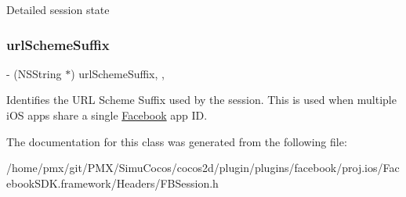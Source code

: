 Detailed session state \mbox{\label{interfaceFBSession_a207345e1a1ca06ee59a56a6b0d78231a}} 
\subsubsection{\texorpdfstring{url\+Scheme\+Suffix}{urlSchemeSuffix}}
{\footnotesize\ttfamily -\/ (N\+S\+String $\ast$) url\+Scheme\+Suffix\hspace{0.3cm}{\ttfamily [read]}, {\ttfamily [atomic]}, {\ttfamily [copy]}}

Identifies the U\+RL Scheme Suffix used by the session. This is used when multiple i\+OS apps share a single \hyperlink{interfaceFacebook}{Facebook} app ID. 

The documentation for this class was generated from the following file\+:\begin{DoxyCompactItemize}
\item 
/home/pmx/git/\+P\+M\+X/\+Simu\+Cocos/cocos2d/plugin/plugins/facebook/proj.\+ios/\+Facebook\+S\+D\+K.\+framework/\+Headers/F\+B\+Session.\+h\end{DoxyCompactItemize}
